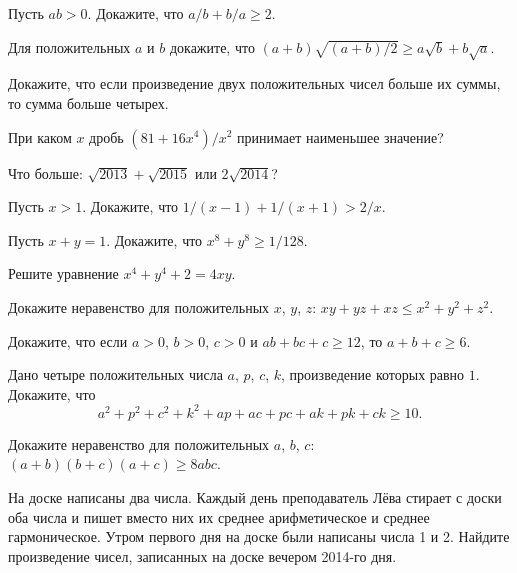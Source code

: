 \begin{problems}

\item
Пусть $a b > 0$.
Докажите, что\enspace
$a / b + b / a \geq 2$.

\item
Для положительных $a$ и $b$ докажите, что\enspace
\(
    (a + b) \sqrt{(a + b) / 2}
\geq
    a \sqrt{b} + b \sqrt{a}
.\)

\item
Докажите, что если произведение двух положительных чисел больше их суммы, то
сумма больше четырех.

\item
При каком $x$ дробь\enspace
$(81 + 16 x^4) / x^2$\enspace
принимает наименьшее значение?

\item
Что больше:\enspace
$\sqrt{2013} + \sqrt{2015}$\enspace
или\enspace
$2 \sqrt{2014}$?

\item
Пусть $x > 1$.
Докажите, что\enspace
$1 / (x - 1) + 1 / (x + 1) > 2 / x$.

\item
Пусть $x + y = 1$.
Докажите, что\enspace
$x^8 + y^8 \geq 1 / 128$.

\item
Решите уравнение\enspace
$x^4 + y^4 + 2 = 4 x y$.

\item
Докажите неравенство для положительных
$x$, $y$, $z$:\enspace
$x y + y z + x z \leq x^2 + y^2 + z^2$.

\item
Докажите, что если $a > 0$, $b > 0$, $c > 0$ и\enspace
$a b + b c + c \geq 12$,\enspace
то\enspace
$a + b + c \geq 6$. 

\item
Дано четыре положительных числа $a$, $p$, $c$, $k$, произведение которых равно
$1$.
Докажите, что
\[
    a^2+ p^2 + c^2 + k^2 + a p + a c + p c + a k + p k + c k \geq 10
.\]

\item
Докажите неравенство для положительных $a$, $b$, $c$:\enspace
$(a + b) (b + c) (a + c) \geq 8 a b c$.

\item
На доске написаны два числа.
Каждый день преподаватель Лёва стирает с доски оба числа и пишет вместо них их
среднее арифметическое и среднее гармоническое.
Утром первого дня на доске были написаны числа 1 и 2.
Найдите произведение чисел, записанных на доске вечером 2014-го дня.

\end{problems}

